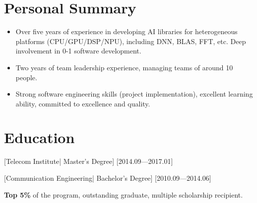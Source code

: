 \documentclass{resume}
\begin{document}


\ResumeTitle


\section{Personal Summary}

\begin{itemize}
  \item Over five years of experience in developing AI libraries for heterogeneous platforms (CPU/GPU/DSP/NPU), including DNN, BLAS, FFT, etc. Deep involvement in 0-1 software development.
  \item Two years of team leadership experience, managing teams of around 10 people.
  \item Strong software engineering skills (project implementation), excellent learning ability, committed to excellence and quality.
\end{itemize}

\section{Education}
[\textnormal{Telecom Institute|} Master's Degree]
[2014.09—2017.01]

\nocite{*} %
\printbibliography[heading={none}]



[\textnormal{Communication Engineering|} Bachelor's Degree]
[2010.09—2014.06]

\textbf{Top 5\%} of the program, outstanding graduate, multiple scholarship recipient.

\end{document}
